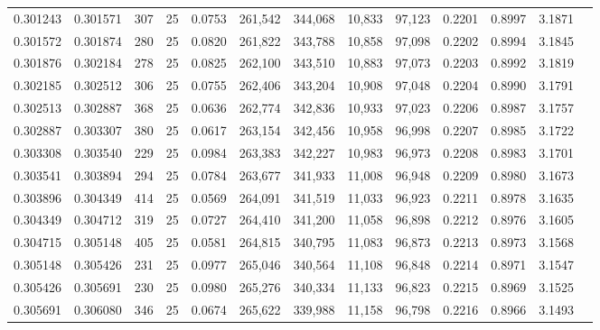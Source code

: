 \begin{tabular}{rrrrrrrrrrrrr}
0.301243 & 0.301571 &   307 &  25 &                                     0.0753 & 261,542 & 344,068 &  10,833 &  97,123 & 0.2201 & 0.8997 & 3.1871 \\
0.301572 & 0.301874 &   280 &  25 &                                     0.0820 & 261,822 & 343,788 &  10,858 &  97,098 & 0.2202 & 0.8994 & 3.1845 \\
0.301876 & 0.302184 &   278 &  25 &                                     0.0825 & 262,100 & 343,510 &  10,883 &  97,073 & 0.2203 & 0.8992 & 3.1819 \\
0.302185 & 0.302512 &   306 &  25 &                                     0.0755 & 262,406 & 343,204 &  10,908 &  97,048 & 0.2204 & 0.8990 & 3.1791 \\
0.302513 & 0.302887 &   368 &  25 &                                     0.0636 & 262,774 & 342,836 &  10,933 &  97,023 & 0.2206 & 0.8987 & 3.1757 \\
0.302887 & 0.303307 &   380 &  25 &                                     0.0617 & 263,154 & 342,456 &  10,958 &  96,998 & 0.2207 & 0.8985 & 3.1722 \\
0.303308 & 0.303540 &   229 &  25 &                                     0.0984 & 263,383 & 342,227 &  10,983 &  96,973 & 0.2208 & 0.8983 & 3.1701 \\
0.303541 & 0.303894 &   294 &  25 &                                     0.0784 & 263,677 & 341,933 &  11,008 &  96,948 & 0.2209 & 0.8980 & 3.1673 \\
0.303896 & 0.304349 &   414 &  25 &                                     0.0569 & 264,091 & 341,519 &  11,033 &  96,923 & 0.2211 & 0.8978 & 3.1635 \\
0.304349 & 0.304712 &   319 &  25 &                                     0.0727 & 264,410 & 341,200 &  11,058 &  96,898 & 0.2212 & 0.8976 & 3.1605 \\
0.304715 & 0.305148 &   405 &  25 &                                     0.0581 & 264,815 & 340,795 &  11,083 &  96,873 & 0.2213 & 0.8973 & 3.1568 \\
0.305148 & 0.305426 &   231 &  25 &                                     0.0977 & 265,046 & 340,564 &  11,108 &  96,848 & 0.2214 & 0.8971 & 3.1547 \\
0.305426 & 0.305691 &   230 &  25 &                                     0.0980 & 265,276 & 340,334 &  11,133 &  96,823 & 0.2215 & 0.8969 & 3.1525 \\
0.305691 & 0.306080 &   346 &  25 &                                     0.0674 & 265,622 & 339,988 &  11,158 &  96,798 & 0.2216 & 0.8966 & 3.1493 \\

\end{tabular}
